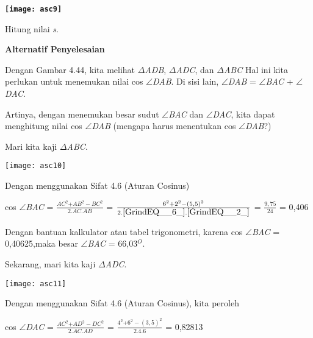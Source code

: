 \documentclass[11pt,fleqn]{book} %
\begin{document}
\begin{myEnumerate}
\begin{itemize}
\noindent 

\textbf{\texttt{[image: asc9]}}

\noindent Hitung nilai \textit{s}.

\noindent 

\noindent \textbf{Alternatif Penyelesaian}

\noindent Dengan Gambar 4.44, kita melihat $\Delta$\textit{ADB}, $\Delta$\textit{ADC}, dan $\Delta$\textit{ABC }Hal ini kita perlukan untuk menemukan nilai cos $\mathrm{\angle }$\textit{DAB}. Di sisi lain, $\mathrm{\angle }$\textit{DAB }= $\mathrm{\angle }$\textit{BAC }+ $\mathrm{\angle }$\textit{DAC}.

\noindent Artinya, dengan menemukan besar sudut $\mathrm{\angle }$\textit{BAC }dan $\mathrm{\angle }$\textit{DAC}, kita dapat menghitung nilai cos $\mathrm{\angle }$\textit{DAB }(mengapa harus menentukan cos $\mathrm{\angle }$\textit{DAB}?) 

\noindent Mari kita kaji $\Delta$\textit{ABC}.

\noindent 

\texttt{[image: asc10]}



\noindent Dengan menggunakan Sifat 4.6 (Aturan Cosinus)

\noindent 

\noindent cos $\mathrm{\angle}$\textit{BAC }= $\frac{{AC}^2{+AB}^2-{BC}^2}{2.AC.AB}$ = $\frac{6^2{+2}^2-{(5,5)}^2}{2.\eqref{GrindEQ__6_}.\eqref{GrindEQ__2_}}$ = $\frac{9,75}{24}$ = 0,406

\noindent 

\noindent Dengan bantuan kalkulator atau tabel trigonometri, karena cos $\mathrm{\angle }$\textit{BAC }= 0,40625,maka besar $\mathrm{\angle }$\textit{BAC }= 66,03${}^{O}$.

\noindent Sekarang, mari kita kaji $\Delta$\textit{ADC}.

\noindent 

\texttt{[image: asc11]}

\noindent 

\noindent 

\noindent Dengan menggunakan Sifat 4.6 (Aturan Cosinus), kita peroleh

\noindent 

\noindent cos $\mathrm{\angle }$\textit{DAC }= $\frac{{AC}^2{+AD}^2-{DC}^2}{2.AC.AD}$ = $\frac{4^2{+6}^2-{(3,5)}^2}{2.4.6}$ = 0,82813


\end{itemize}
\end{myEnumerate}
\end{document}
